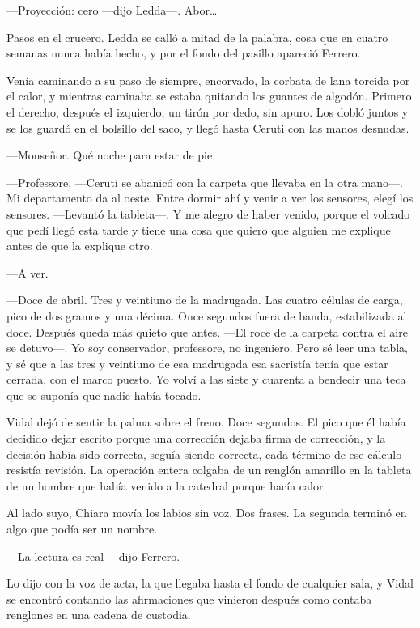 ---Proyección: cero ---dijo Ledda---. Abor\ldots{}

Pasos en el crucero. Ledda se calló a mitad de la palabra, cosa que en cuatro semanas nunca había hecho, y por el fondo del pasillo apareció Ferrero.

Venía caminando a su paso de siempre, encorvado, la corbata de lana torcida por el calor, y mientras caminaba se estaba quitando los guantes de algodón. Primero el derecho, después el izquierdo, un tirón por dedo, sin apuro. Los dobló juntos y se los guardó en el bolsillo del saco, y llegó hasta Ceruti con las manos desnudas.

---Monseñor. Qué noche para estar de pie.

---Professore. ---Ceruti se abanicó con la carpeta que llevaba en la otra mano---. Mi departamento da al oeste. Entre dormir ahí y venir a ver los sensores, elegí los sensores. ---Levantó la tableta---. Y me alegro de haber venido, porque el volcado que pedí llegó esta tarde y tiene una cosa que quiero que alguien me explique antes de que la explique otro.

---A ver.

---Doce de abril. Tres y veintiuno de la madrugada. Las cuatro células de carga, pico de dos gramos y una décima. Once segundos fuera de banda, estabilizada al doce. Después queda más quieto que antes. ---El roce de la carpeta contra el aire se detuvo---. Yo soy conservador, professore, no ingeniero. Pero sé leer una tabla, y sé que a las tres y veintiuno de esa madrugada esa sacristía tenía que estar cerrada, con el marco puesto. Yo volví a las siete y cuarenta a bendecir una teca que se suponía que nadie había tocado.

Vidal dejó de sentir la palma sobre el freno. Doce segundos. El pico que él había decidido dejar escrito porque una corrección dejaba firma de corrección, y la decisión había sido correcta, seguía siendo correcta, cada término de ese cálculo resistía revisión. La operación entera colgaba de un renglón amarillo en la tableta de un hombre que había venido a la catedral porque hacía calor.

Al lado suyo, Chiara movía los labios sin voz. Dos frases. La segunda terminó en algo que podía ser un nombre.

---La lectura es real ---dijo Ferrero.

Lo dijo con la voz de acta, la que llegaba hasta el fondo de cualquier sala, y Vidal se encontró contando las afirmaciones que vinieron después como contaba renglones en una cadena de custodia.

